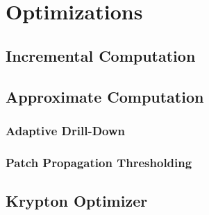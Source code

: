\section{Optimizations}

\subsection{Incremental Computation}\label{sec:inc_computation}

\subsection{Approximate Computation}

\subsubsection{Adaptive Drill-Down}

\subsubsection{Patch Propagation Thresholding}

\subsection{Krypton Optimizer}